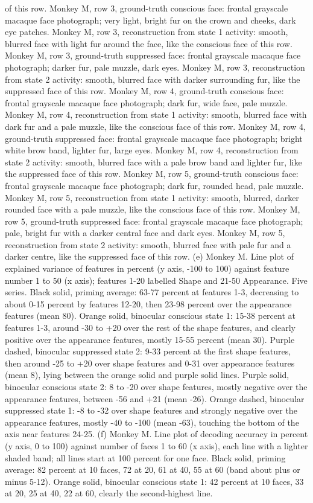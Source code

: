 \documentclass{article}
\begin{document}
of this row. Monkey M, row 3, ground-truth conscious face: frontal grayscale macaque face photograph; very light, bright fur on the crown and cheeks, dark eye patches. Monkey M, row 3, reconstruction from state 1 activity: smooth, blurred face with light fur around the face, like the conscious face of this row. Monkey M, row 3, ground-truth suppressed face: frontal grayscale macaque face photograph; darker fur, pale muzzle, dark eyes. Monkey M, row 3, reconstruction from state 2 activity: smooth, blurred face with darker surrounding fur, like the suppressed face of this row. Monkey M, row 4, ground-truth conscious face: frontal grayscale macaque face photograph; dark fur, wide face, pale muzzle. Monkey M, row 4, reconstruction from state 1 activity: smooth, blurred face with dark fur and a pale muzzle, like the conscious face of this row. Monkey M, row 4, ground-truth suppressed face: frontal grayscale macaque face photograph; bright white brow band, lighter fur, large eyes. Monkey M, row 4, reconstruction from state 2 activity: smooth, blurred face with a pale brow band and lighter fur, like the suppressed face of this row. Monkey M, row 5, ground-truth conscious face: frontal grayscale macaque face photograph; dark fur, rounded head, pale muzzle. Monkey M, row 5, reconstruction from state 1 activity: smooth, blurred, darker rounded face with a pale muzzle, like the conscious face of this row. Monkey M, row 5, ground-truth suppressed face: frontal grayscale macaque face photograph; pale, bright fur with a darker central face and dark eyes. Monkey M, row 5, reconstruction from state 2 activity: smooth, blurred face with pale fur and a darker centre, like the suppressed face of this row. (e) Monkey M. Line plot of explained variance of features in percent (y axis, -100 to 100) against feature number 1 to 50 (x axis); features 1-20 labelled Shape and 21-50 Appearance. Five series. Black solid, priming average: 63-77 percent at features 1-3, decreasing to about 0-15 percent by features 12-20, then 23-98 percent over the appearance features (mean 80). Orange solid, binocular conscious state 1: 15-38 percent at features 1-3, around -30 to +20 over the rest of the shape features, and clearly positive over the appearance features, mostly 15-55 percent (mean 30). Purple dashed, binocular suppressed state 2: 9-33 percent at the first shape features, then around -25 to +20 over shape features and 0-31 over appearance features (mean 8), lying between the orange solid and purple solid lines. Purple solid, binocular conscious state 2: 8 to -20 over shape features, mostly negative over the appearance features, between -56 and +21 (mean -26). Orange dashed, binocular suppressed state 1: -8 to -32 over shape features and strongly negative over the appearance features, mostly -40 to -100 (mean -63), touching the bottom of the axis near features 24-25. (f) Monkey M. Line plot of decoding accuracy in percent (y axis, 0 to 100) against number of faces 1 to 60 (x axis), each line with a lighter shaded band; all lines start at 100 percent for one face. Black solid, priming average: 82 percent at 10 faces, 72 at 20, 61 at 40, 55 at 60 (band about plus or minus 5-12). Orange solid, binocular conscious state 1: 42 percent at 10 faces, 33 at 20, 25 at 40, 22 at 60, clearly the second-highest line. 
\end{document}
